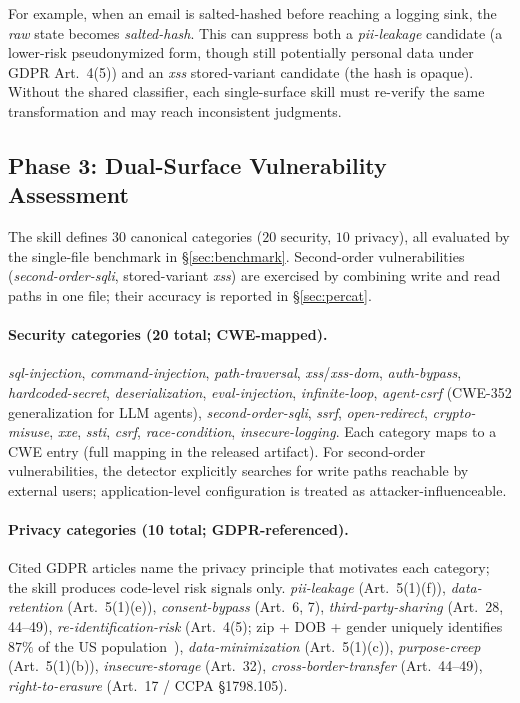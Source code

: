\documentclass[runningheads]{llncs}
\begin{document}
For example, when an email is salted-hashed before reaching a logging sink, the \emph{raw} state becomes \emph{salted-hash}. This can suppress both a \emph{pii-leakage} candidate (a lower-risk pseudonymized form, though still potentially personal data under GDPR Art.~4(5)) and an \emph{xss} stored-variant candidate (the hash is opaque). Without the shared classifier, each single-surface skill must re-verify the same transformation and may reach inconsistent judgments.

\subsection{Phase 3: Dual-Surface Vulnerability Assessment}\label{sec:categories}

The skill defines $30$ canonical categories ($20$ security, $10$ privacy), all evaluated by the single-file benchmark in \S\ref{sec:benchmark}. Second-order vulnerabilities (\emph{second-order-sqli}, stored-variant \emph{xss}) are exercised by combining write and read paths in one file; their accuracy is reported in \S\ref{sec:percat}.

\paragraph{Security categories (20 total; CWE-mapped).} \emph{sql-injection}, \emph{command-injection}, \emph{path-traversal}, \emph{xss}/\emph{xss-dom}, \emph{auth-bypass}, \emph{hardcoded-secret}, \emph{deserialization}, \emph{eval-injection}, \emph{infinite-loop}, \emph{agent-csrf} (CWE-352 generalization for LLM agents), \emph{second-order-sqli}, \emph{ssrf}, \emph{open-redirect}, \emph{crypto-misuse}, \emph{xxe}, \emph{ssti}, \emph{csrf}, \emph{race-condition}, \emph{insecure-logging}. Each category maps to a CWE entry (full mapping in the released artifact). For second-order vulnerabilities, the detector explicitly searches for write paths reachable by external users; application-level configuration is treated as attacker-influenceable.

\paragraph{Privacy categories (10 total; GDPR-referenced).} Cited GDPR articles name the privacy principle that motivates each category; the skill produces code-level risk signals only. \emph{pii-leakage} (Art.~5(1)(f)), \emph{data-retention} (Art.~5(1)(e)), \emph{consent-bypass} (Art.~6, 7), \emph{third-party-sharing} (Art.~28, 44--49), \emph{re-identification-risk} (Art.~4(5); zip + DOB + gender uniquely identifies $87\%$ of the US population~\cite{sweeney2002kanonymity}), \emph{data-minimization} (Art.~5(1)(c)), \emph{purpose-creep} (Art.~5(1)(b)), \emph{insecure-storage} (Art.~32), \emph{cross-border-transfer} (Art.~44--49), \emph{right-to-erasure} (Art.~17 / CCPA \S1798.105).
\end{document}
